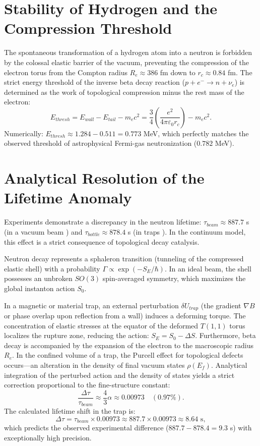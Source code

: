 \documentclass[12pt,a4paper]{article}
\begin{document}
\section{Stability of Hydrogen and the Compression Threshold}
The spontaneous transformation of a hydrogen atom into a neutron is forbidden by the colossal elastic barrier of the vacuum, preventing the compression of the electron torus from the Compton radius $R_e \approx 386$ fm down to $r_c \approx 0.84$ fm. 
The strict energy threshold of the inverse beta decay reaction ($p + e^- \to n + \nu_e$) is determined as the work of topological compression minus the rest mass of the electron:
\begin{equation}
E_{thresh} = E_{wall} - E_{tail} - m_e c^2 = \frac{3}{4} \left( \frac{e^2}{4\pi\varepsilon_0 r_c} \right) - m_e c^2.
\end{equation}
Numerically: $E_{thresh} \approx 1.284 - 0.511 = 0.773$ MeV, which perfectly matches the observed threshold of astrophysical Fermi-gas neutronization ($0.782$ MeV).

\section{Analytical Resolution of the Lifetime Anomaly}
Experiments demonstrate a discrepancy in the neutron lifetime: $\tau_{beam} \approx 887.7$ s (in a vacuum beam \cite{beam2013}) and $\tau_{bottle} \approx 878.4$ s (in traps \cite{bottle2021}). In the continuum model, this effect is a strict consequence of topological decay catalysis.

Neutron decay represents a sphaleron transition (tunneling of the compressed elastic shell) with a probability $\Gamma \propto \exp(-S_E/\hbar)$. In an ideal beam, the shell possesses an unbroken $SO(3)$ spin-averaged symmetry, which maximizes the global instanton action $S_0$.

In a magnetic or material trap, an external perturbation $\delta U_{trap}$ (the gradient $\nabla B$ or phase overlap upon reflection from a wall) induces a deforming torque. The concentration of elastic stresses at the equator of the deformed $T(1,1)$ torus localizes the rupture zone, reducing the action: $S_E = S_0 - \Delta S$.
Furthermore, beta decay is accompanied by the expansion of the electron to the macroscopic radius $R_e$. In the confined volume of a trap, the Purcell effect for topological defects occurs—an alteration in the density of final vacuum states $\rho(E_f)$. Analytical integration of the perturbed action and the density of states yields a strict correction proportional to the fine-structure constant:
\begin{equation}
\frac{\Delta \tau}{\tau_{beam}} \approx \frac{4}{3} \alpha \approx 0.00973 \quad (0.97\%).
\end{equation}
The calculated lifetime shift in the trap is:
\begin{equation}
\Delta \tau = \tau_{beam} \times 0.00973 \approx 887.7 \times 0.00973 \approx 8.64 \text{ s},
\end{equation}
which predicts the observed experimental difference ($887.7 - 878.4 = 9.3$ s) with exceptionally high precision.
\end{document}
